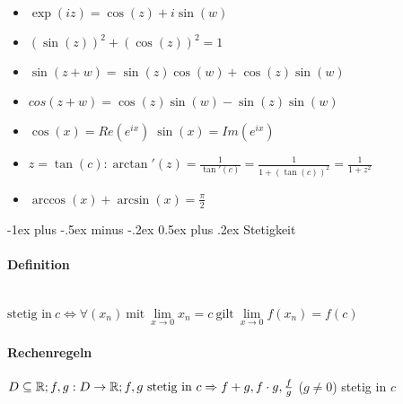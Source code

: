 \documentclass[paper=a3,paper=landscape, fontsize=9pt,DIV=30]{scrartcl}
\makeatletter
\newcommand{\real}{{\mathbb{R}}}
\renewcommand{\section}{\@startsection{section}{1}{0mm}%
  {-1ex plus -.5ex minus -.2ex}%
  {0.5ex plus .2ex}%
  {\color{blue}\normalfont\large\bfseries}}
\makeatother
\begin{document}
\begin{multicols*}{4}
  \begin{itemize}
  \item $\exp(iz) = \cos(z)+i\sin(w)$
  \item $(\sin(z))^2+(\cos(z))^2=1$
  \item $\sin(z+w)=\sin(z)\cos(w)+\cos(z)\sin(w)$
  \item $cos(z+w)=\cos(z)\sin(w)-\sin(z)\sin(w)$
  \item $\cos(x)=Re(e^{ix}) \; \sin(x)=Im(e^{ix})$
  \item $z=\tan(c): \arctan'(z)=\frac{1}{\tan'(c)}=\frac{1}{1+(\tan(c))^2}=\frac{1}{1+z^2}$
  \item $\arccos(x)+\arcsin(x)=\frac{\pi}{2}$
  \end{itemize}




  \section{Stetigkeit}

  \paragraph{Definition}\hspace{0pt} \\
  $\text{stetig in}\ c \Leftrightarrow \forall (x_n) \ \text{mit}\ \lim\limits_{x \rightarrow 0}x_n = c \ \text{gilt}\ \lim\limits_{x \rightarrow 0}f(x_n)=f(c)$

  \paragraph{Rechenregeln}
  $D \subseteq \real;f,g: D \rightarrow \real;f,g ~\text{stetig in}\ c \\ \Rightarrow f+g, f \cdot g,\frac{f}{g}$ ($g \neq 0$) stetig in $c$



\end{multicols*}
\end{document}
